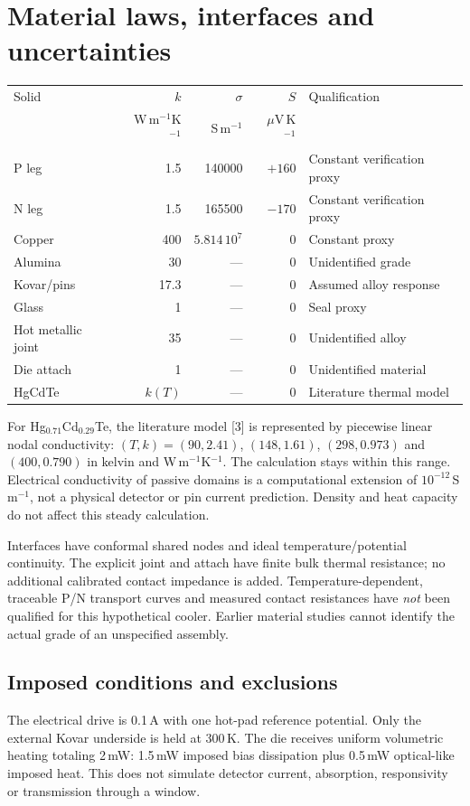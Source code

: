 \documentclass[11pt,a4paper]{article}
\begin{document}
\clearpage
\section{Material laws, interfaces and uncertainties}
\begin{tabularx}{\linewidth}{lrrrX}\toprule
Solid & $k$ & $\sigma$ & $S$ & Qualification\\
 & W\,m$^{-1}$K$^{-1}$ & S\,m$^{-1}$ & $\mu$V\,K$^{-1}$ & \\\midrule
P leg & 1.5 & 140000 & $+160$ & Constant verification proxy\\
N leg & 1.5 & 165500 & $-170$ & Constant verification proxy\\
Copper & 400 & $5.814\,10^7$ & 0 & Constant proxy\\
Alumina & 30 & --- & 0 & Unidentified grade\\
Kovar/pins & 17.3 & --- & 0 & Assumed alloy response\\
Glass & 1 & --- & 0 & Seal proxy\\
Hot metallic joint & 35 & --- & 0 & Unidentified alloy\\
Die attach & 1 & --- & 0 & Unidentified material\\
HgCdTe & $k(T)$ & --- & 0 & Literature thermal model\\\bottomrule
\end{tabularx}

For Hg$_{0.71}$Cd$_{0.29}$Te, the literature model [3] is represented by piecewise linear nodal conductivity: $(T,k)=(90,2.41)$, $(148,1.61)$, $(298,0.973)$ and $(400,0.790)$ in kelvin and W\,m$^{-1}$K$^{-1}$. The calculation stays within this range. Electrical conductivity of passive domains is a computational extension of $10^{-12}$\,S\,m$^{-1}$, not a physical detector or pin current prediction. Density and heat capacity do not affect this steady calculation.

Interfaces have conformal shared nodes and ideal temperature/potential continuity. The explicit joint and attach have finite bulk thermal resistance; no additional calibrated contact impedance is added. Temperature-dependent, traceable P/N transport curves and measured contact resistances have \emph{not} been qualified for this hypothetical cooler. Earlier material studies cannot identify the actual grade of an unspecified assembly.

\subsection{Imposed conditions and exclusions}
The electrical drive is 0.1\,A with one hot-pad reference potential. Only the external Kovar underside is held at 300\,K. The die receives uniform volumetric heating totaling 2\,mW: 1.5\,mW imposed bias dissipation plus 0.5\,mW optical-like imposed heat. This does not simulate detector current, absorption, responsivity or transmission through a window.
\end{document}
